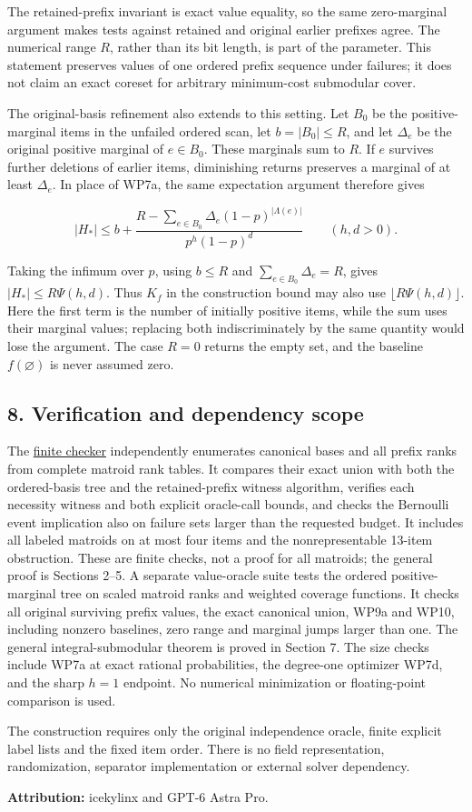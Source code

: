 The retained-prefix invariant is exact value equality, so the same zero-marginal argument makes tests against retained and original earlier prefixes agree. The numerical range \(R\), rather than its bit length, is part of the parameter. This statement preserves values of one ordered prefix sequence under failures; it does not claim an exact coreset for arbitrary minimum-cost submodular cover.

The original-basis refinement also extends to this setting. Let \(B_0\) be the positive-marginal items in the unfailed ordered scan, let \(b=|B_0|\le R\), and let \(\Delta_e\) be the original positive marginal of \(e\in B_0\). These marginals sum to \(R\). If \(e\) survives further deletions of earlier items, diminishing returns preserves a marginal of at least \(\Delta_e\). In place of WP7a, the same expectation argument therefore gives

\[
|H_*|\le b+
\frac{R-\displaystyle\sum_{e\in B_0}
\Delta_e(1-p)^{|\Lambda(e)|}}{p^h(1-p)^d}
\qquad(h,d>0).
\tag{WP10}
\]

Taking the infimum over \(p\), using \(b\le R\) and \(\sum_{e\in B_0}\Delta_e=R\), gives \(|H_*|\le R\Psi(h,d)\). Thus \(K_f\) in the construction bound may also use \(\lfloor R\Psi(h,d)\rfloor\). Here the first term is the number of initially positive items, while the sum uses their marginal values; replacing both indiscriminately by the same quantity would lose the argument. The case \(R=0\) returns the empty set, and the baseline \(f(\varnothing)\) is never assumed zero.

\hypertarget{af-eb38c0014f-verification-and-dependency-scope}{%
\subsection{8. Verification and dependency scope}\label{af-eb38c0014f-verification-and-dependency-scope}}

The \href{https://github.com/icekylinx/algorithm-frontier/blob/main/problems/matroid-failure-summaries/verify/check_weighted_prefix.py}{finite checker} independently enumerates canonical bases and all prefix ranks from complete matroid rank tables. It compares their exact union with both the ordered-basis tree and the retained-prefix witness algorithm, verifies each necessity witness and both explicit oracle-call bounds, and checks the Bernoulli event implication also on failure sets larger than the requested budget. It includes all labeled matroids on at most four items and the nonrepresentable 13-item obstruction. These are finite checks, not a proof for all matroids; the general proof is Sections 2--5. A separate value-oracle suite tests the ordered positive-marginal tree on scaled matroid ranks and weighted coverage functions. It checks all original surviving prefix values, the exact canonical union, WP9a and WP10, including nonzero baselines, zero range and marginal jumps larger than one. The general integral-submodular theorem is proved in Section 7. The size checks include WP7a at exact rational probabilities, the degree-one optimizer WP7d, and the sharp \(h=1\) endpoint. No numerical minimization or floating-point comparison is used.

The construction requires only the original independence oracle, finite explicit label lists and the fixed item order. There is no field representation, randomization, separator implementation or external solver dependency.

\textbf{Attribution:} icekylinx and GPT-6 Astra Pro.
